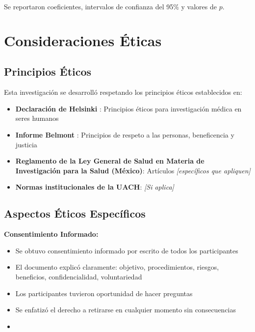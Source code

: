 Se reportaron coeficientes, intervalos de confianza del 95\% y valores de $p$.

\section{Consideraciones Éticas}
\label{sec:consideraciones_eticas}


\subsection{Principios Éticos}
\label{subsec:principios_eticos}

Esta investigación se desarrolló respetando los principios éticos establecidos en:

\begin{itemize}
    \item \textbf{Declaración de Helsinki} \cite{helsinki}: Principios éticos para investigación médica en seres humanos
    \item \textbf{Informe Belmont} \cite{belmont}: Principios de respeto a las personas, beneficencia y justicia
    \item \textbf{Reglamento de la Ley General de Salud en Materia de Investigación para la Salud (México)}: Artículos \textit{[específicos que apliquen]}
    \item \textbf{Normas institucionales de la UACH}: \textit{[Si aplica]}
\end{itemize}

\subsection{Aspectos Éticos Específicos}
\label{subsec:aspectos_eticos_especificos}

\textbf{Consentimiento Informado:}

\begin{itemize}
    \item Se obtuvo consentimiento informado por escrito de todos los participantes
    \item El documento explicó claramente: objetivo, procedimientos, riesgos, beneficios, confidencialidad, voluntariedad
    \item Los participantes tuvieron oportunidad de hacer preguntas
    \item Se enfatizó el derecho a retirarse en cualquier momento sin consecuencias
    \item [La carta de consentimiento se presenta en el Anexo \ref{anexo:consentimiento}]
\end{itemize}

